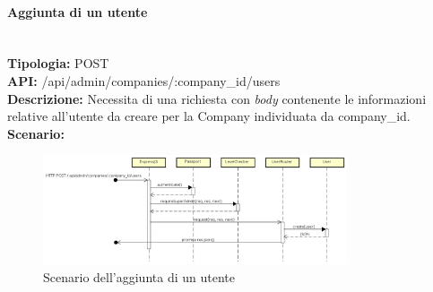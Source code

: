 \newpage
\paragraph{Aggiunta di un utente}\mbox{}\\
\textbf{Tipologia:} POST \\
\textbf{API:} /api/admin/companies/:company\_id/users \\
\textbf{Descrizione:} Necessita di una richiesta con \textit{body} contenente le informazioni relative all'utente da creare per la Company individuata da company\_id. \\
\textbf{Scenario:} 
\begin{figure}[H]
\centering
\includegraphics[width=0.8\textwidth]{res/sections/backend/sequence/(POST)userSA.png}
\caption{Scenario dell'aggiunta di un utente}
\end{figure}
